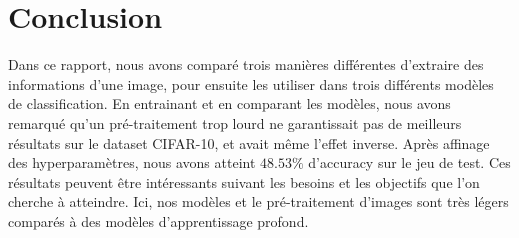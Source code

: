 \section{Conclusion}

Dans ce rapport, nous avons comparé trois manières différentes d'extraire des informations d'une image, pour ensuite les utiliser dans trois différents modèles de classification. En entrainant et en comparant les modèles, nous avons remarqué qu'un pré-traitement trop lourd ne garantissait pas de meilleurs résultats sur le dataset CIFAR-10, et avait même l'effet inverse. Après affinage des hyperparamètres, nous avons atteint $48.53\%$ d'accuracy sur le jeu de test. Ces résultats peuvent être intéressants suivant les besoins et les objectifs que l'on cherche à atteindre. Ici, nos modèles et le pré-traitement d'images sont très légers comparés à des modèles d'apprentissage profond.